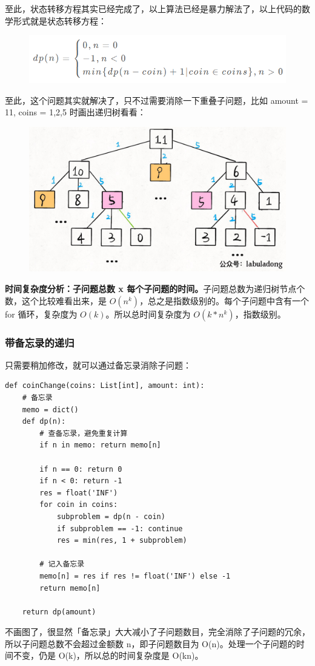 \documentclass[12pt]{article}
\begin{document}
至此，状态转移方程其实已经完成了，以上算法已经是暴力解法了，以上代码的数学形式就是状态转移方程：
\begin{figure}[H]
    \centering
    \includegraphics[width=.5\textwidth]{fig/Dynamic_Programming_Status_Transition_Coin.png}
\end{figure}

至此，这个问题其实就解决了，只不过需要消除一下重叠子问题，比如 amount = 11, coins = {1,2,5} 时画出递归树看看：
\begin{figure}[H]
    \centering
    \includegraphics[width=.5\textwidth]{fig/Dynamic_Programming_Recursion_Tree_5.jpg}
\end{figure}

\textbf{时间复杂度分析：子问题总数 x 每个子问题的时间。}子问题总数为递归树节点个数，这个比较难看出来，是 $O(n^k)$，总之是指数级别的。每个子问题中含有一个 for 循环，复杂度为 $O(k)$。所以总时间复杂度为 $O(k * n^k)$，指数级别。

\subsubsection{带备忘录的递归}
只需要稍加修改，就可以通过备忘录消除子问题：
\begin{lstlisting}
def coinChange(coins: List[int], amount: int):
    # 备忘录
    memo = dict()
    def dp(n):
        # 查备忘录，避免重复计算
        if n in memo: return memo[n]

        if n == 0: return 0
        if n < 0: return -1
        res = float('INF')
        for coin in coins:
            subproblem = dp(n - coin)
            if subproblem == -1: continue
            res = min(res, 1 + subproblem)
        
        # 记入备忘录
        memo[n] = res if res != float('INF') else -1
        return memo[n]
    
    return dp(amount)
\end{lstlisting}
不画图了，很显然「备忘录」大大减小了子问题数目，完全消除了子问题的冗余，所以子问题总数不会超过金额数 n，即子问题数目为 O(n)。处理一个子问题的时间不变，仍是 O(k)，所以总的时间复杂度是 O(kn)。
\end{document}
